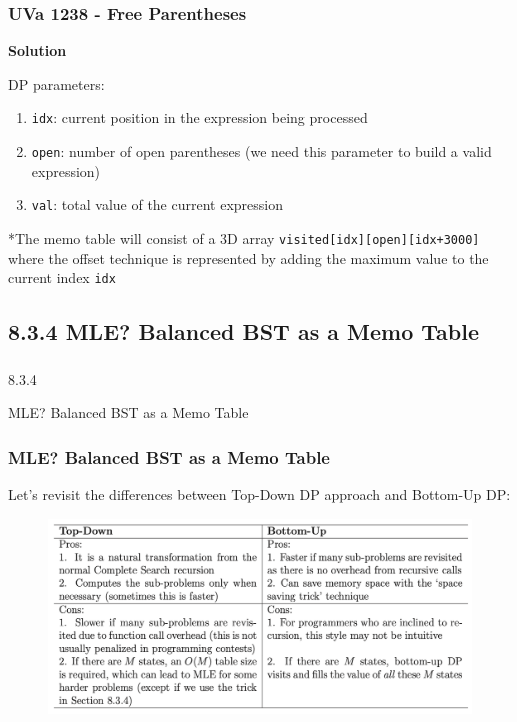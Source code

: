 \documentclass{beamer}
\begin{document}
\begin{frame}[fragile]
\frametitle{UVa 1238 - Free Parentheses}

\textbf{Solution}

\vspace{0.3cm}

DP parameters:

\begin{enumerate}
    \item \verb|idx|:  current position in the expression being processed
    \item \verb|open|: number of open parentheses (we need this parameter to build a valid expression)
    \item \verb|val|: total value of the current expression
\end{enumerate}

\vspace{0.3cm}
\pause

\color{blue}*The memo table will consist of a 3D array \verb|visited[idx][open][idx+3000]| where the offset technique is represented by adding the maximum value to the current index \verb|idx|\color{black}

\end{frame}


\subsection{8.3.4 MLE? Balanced BST as a Memo Table}
\begin{frame}
\frametitle{}
\color{blue}
\centerline{\Large{8.3.4}}
\vspace{0.3cm} 
\centerline{\Large{MLE? Balanced BST as a Memo Table}}
\color{black}
\end{frame}

\begin{frame}[fragile]
\frametitle{MLE? Balanced BST as a Memo Table}

Let's revisit the differences between Top-Down DP approach and Bottom-Up DP:

\begin{figure}
    \centering
    \includegraphics[scale=0.4]{imgs/td_vs_bu.png}
\end{figure}

\end{frame}
\end{document}
